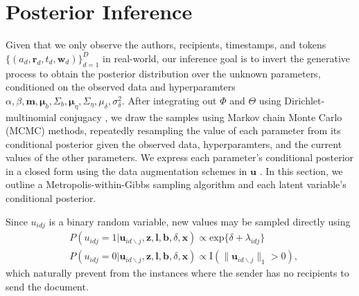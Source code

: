 \documentclass{article}
\begin{document}
\section{Posterior Inference}\label{sec:Inference}
Given that we only observe the authors, recipients, timestamps, and tokens $ \{ (a_d, \boldsymbol{r}_d, t_d,  \boldsymbol{w}_d)\}_{d=1}^D$ in real-world, our inference goal is to invert the generative process to obtain the posterior distribution over the unknown parameters, conditioned on the observed data and hyperparamters $\alpha, \beta, \boldsymbol{m}, \boldsymbol{\mu}_b, \Sigma_b, \boldsymbol{\mu}_\eta, \Sigma_\eta, {\mu}_\delta,\sigma^2_\delta$. After integrating out $\Phi$ and $\Theta$ using Dirichlet-multinomial conjugacy \cite{griffiths2004finding}, we draw the samples using Markov chain Monte Carlo (MCMC) methods, repeatedly resampling the value of each parameter from its conditional posterior given the observed data, hyperparamters, and the current values of the other parameters. We express each parameter’s conditional posterior in a closed form using the data augmentation schemes in $\boldsymbol{u}$ \cite{tanner1987calculation}. In this section, we outline a Metropolis-within-Gibbs sampling algorithm and each latent variable's conditional posterior.

Since $u_{idj}$ is a binary random variable, new values may be sampled directly using
\begin{equation}
\begin{aligned}
 &P(u_{idj}=1| \boldsymbol{u}_{id\backslash j}, \boldsymbol{z},\boldsymbol{l},\boldsymbol{b}, \delta, \boldsymbol{x})
 \propto \mbox{exp}\{\delta+\lambda_{idj}\}\\
 &P(u_{idj}=0| \boldsymbol{u}_{id\backslash j}, \boldsymbol{z},\boldsymbol{l},\boldsymbol{b}, \delta, \boldsymbol{x})\propto \text{I}(\lVert\boldsymbol{u}_{id\backslash j}\rVert_1 > 0 ),
\end{aligned}
\label{eqn:latentreceiver}
\end{equation}
which naturally prevent from the instances where the sender has no recipients to send the document.
\end{document}

